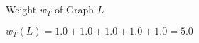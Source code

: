 \documentclass{beamer}
\newcommand{\graphbox}[8]{
  \begin{scope}[xshift=#2,yshift=#3]
    \draw [rounded corners=2mm] (0,0) rectangle (#4,-#5);
    \node at (0,0mm) [anchor=north west,inner sep=1mm] {#1};
    \begin{scope}[xshift=#4/2+#6,yshift=#7] 
    #8
    \end{scope}
  \end{scope}
}
\begin{document}
\begin{frame}{Weight $w_T$ of Graph $L$}
      
      $w_T(L) = 1.0 + 1.0 + 1.0 + 1.0 + 1.0 = 5.0$
\end{frame}
\end{document}
